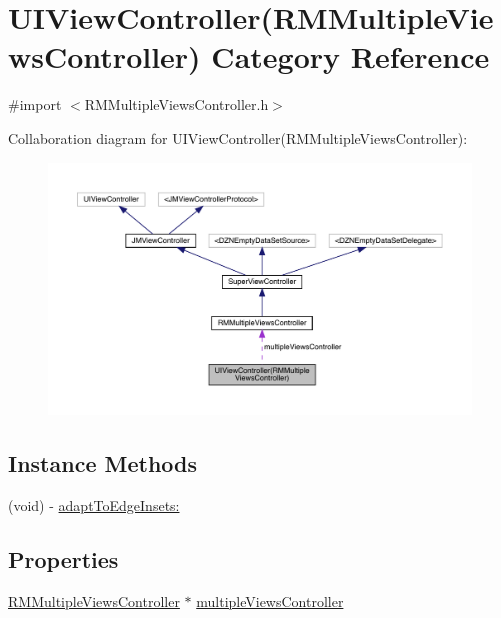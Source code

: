 \hypertarget{category_u_i_view_controller_07_r_m_multiple_views_controller_08}{}\section{U\+I\+View\+Controller(R\+M\+Multiple\+Views\+Controller) Category Reference}
\label{category_u_i_view_controller_07_r_m_multiple_views_controller_08}


{\ttfamily \#import $<$R\+M\+Multiple\+Views\+Controller.\+h$>$}



Collaboration diagram for U\+I\+View\+Controller(R\+M\+Multiple\+Views\+Controller)\+:\nopagebreak
\begin{figure}[H]
\begin{center}
\leavevmode
\includegraphics[width=350pt]{category_u_i_view_controller_07_r_m_multiple_views_controller_08__coll__graph}
\end{center}
\end{figure}
\subsection*{Instance Methods}
\begin{DoxyCompactItemize}
\item 
(void) -\/ \mbox{\hyperlink{category_u_i_view_controller_07_r_m_multiple_views_controller_08_aabb1120009219637f60bd53874cab7ef}{adapt\+To\+Edge\+Insets\+:}}
\end{DoxyCompactItemize}
\subsection*{Properties}
\begin{DoxyCompactItemize}
\item 
\mbox{\hyperlink{interface_r_m_multiple_views_controller}{R\+M\+Multiple\+Views\+Controller}} $\ast$ \mbox{\hyperlink{category_u_i_view_controller_07_r_m_multiple_views_controller_08_a08f849850bb40e298d286890c8fb03bc}{multiple\+Views\+Controller}}
\end{DoxyCompactItemize}


